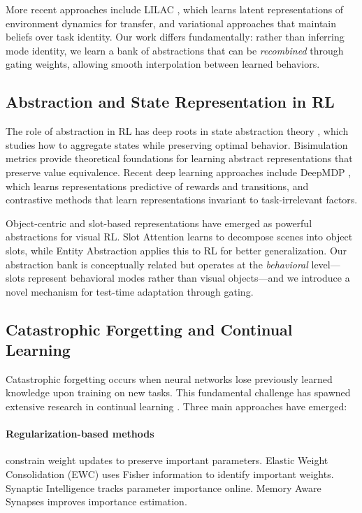 \documentclass{article}
\begin{document}
More recent approaches include LILAC \citep{xie2020deep}, which learns latent representations of environment dynamics for transfer, and variational approaches \citep{zintgraf2020varibad} that maintain beliefs over task identity. Our work differs fundamentally: rather than inferring mode identity, we learn a bank of abstractions that can be \emph{recombined} through gating weights, allowing smooth interpolation between learned behaviors.

\subsection{Abstraction and State Representation in RL}

The role of abstraction in RL has deep roots in state abstraction theory \citep{li2006towards}, which studies how to aggregate states while preserving optimal behavior. Bisimulation metrics \citep{ferns2004metrics, castro2010using} provide theoretical foundations for learning abstract representations that preserve value equivalence. Recent deep learning approaches include DeepMDP \citep{gelada2019deepmdp}, which learns representations predictive of rewards and transitions, and contrastive methods \citep{laskin2020curl} that learn representations invariant to task-irrelevant factors.

Object-centric and slot-based representations have emerged as powerful abstractions for visual RL. Slot Attention \citep{locatello2020object} learns to decompose scenes into object slots, while Entity Abstraction \citep{veerapaneni2020entity} applies this to RL for better generalization. Our abstraction bank is conceptually related but operates at the \emph{behavioral} level---slots represent behavioral modes rather than visual objects---and we introduce a novel mechanism for test-time adaptation through gating.

\subsection{Catastrophic Forgetting and Continual Learning}

Catastrophic forgetting \citep{mccloskey1989catastrophic, french1999catastrophic} occurs when neural networks lose previously learned knowledge upon training on new tasks. This fundamental challenge has spawned extensive research in continual learning \citep{parisi2019continual}. Three main approaches have emerged:

\paragraph{Regularization-based methods} constrain weight updates to preserve important parameters. Elastic Weight Consolidation (EWC) \citep{kirkpatrick2017overcoming} uses Fisher information to identify important weights. Synaptic Intelligence \citep{zenke2017continual} tracks parameter importance online. Memory Aware Synapses \citep{aljundi2018memory} improves importance estimation.
\end{document}
